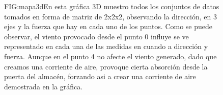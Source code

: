 \begin{figure}[Mapa de viento 3D]{FIG:mapa3d}{En esta gráfica 3D muestro todos los conjuntos de datos tomados en forma de matriz de 2x2x2, observando la dirección, en 3 ejes y la fuerza que hay en cada uno de los puntos. Como se puede observar, el viento provocado desde el punto 0 influye se ve representado en cada una de las medidas en cuando a dirección y fuerza. Aunque en el punto 4 no afecte el viento generado, dado que creamos una corriente de aire, provoque cierta absorción desde la puerta del almacén, forzando asi a crear una corriente de aire demostrada en la gráfica.}
\end{figure}